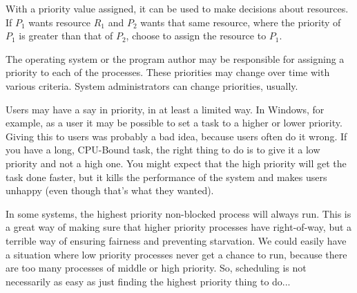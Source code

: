 With a priority value assigned, it can be used to make decisions about resources. If $P_{1}$ wants resource $R_{1}$ and $P_{2}$ wants that same resource, where the priority of $P_{1}$ is greater than that of $P_{2}$, choose to assign the resource to $P_{1}$.

The operating system or the program author may be responsible for assigning a priority to each of the processes. These priorities may change over time with various criteria. System administrators can change priorities, usually.

Users may have a say in priority, in at least a limited way. In Windows, for example, as a user it may be possible to set a task to a higher or lower priority. Giving this to users was probably a bad idea, because users often do it wrong. If you have a long, CPU-Bound task, the right thing to do is to give it a low priority and not a high one. You might expect that the high priority will get the task done faster, but it kills the performance of the system and makes users unhappy (even though that's what they wanted).

In some systems, the highest priority non-blocked process will always run. This is a great way of making sure that higher priority processes have right-of-way, but a terrible way of ensuring fairness and preventing starvation. We could easily have a situation where low priority processes never get a chance to run, because there are too many processes of middle or high priority. So, scheduling is not necessarily as easy as just finding the highest priority thing to do...




